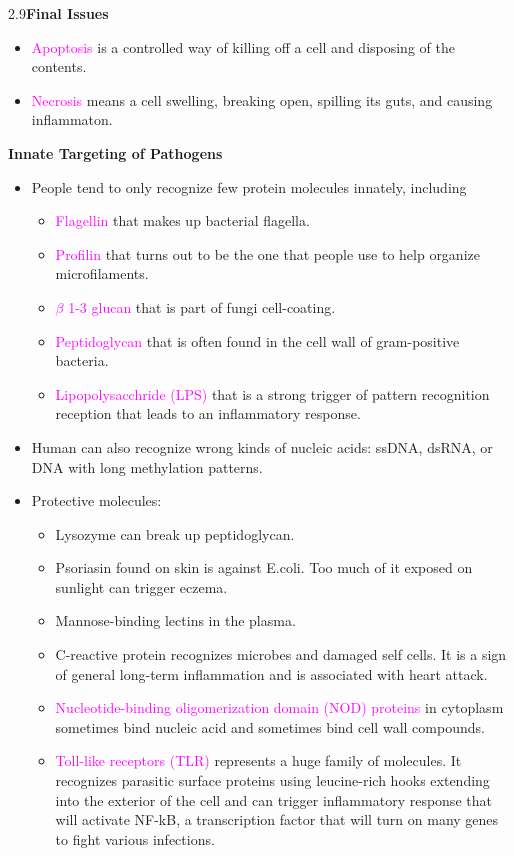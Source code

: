 \documentclass[UTF8]{book}
\newcommand{\concept}[1]{\textcolor{magenta}{#1}}
\begin{document}
2.9\quad \textbf{Final Issues}
\begin{itemize}
\item \concept{Apoptosis} is a controlled way of killing off a cell and disposing of the contents.
\item \concept{Necrosis} means a cell swelling, breaking open, spilling its guts, and causing inflammaton.
\end{itemize}
\newpage
{}\quad \textbf{Innate Targeting of Pathogens}
\begin{itemize}
\item People tend to only recognize few protein molecules innately, including 
\begin{itemize}
	\item \concept{Flagellin} that makes up bacterial flagella.
	\item \concept{Profilin} that turns out to be the one that people use to help organize microfilaments.
	\item \concept{$\beta$ 1-3 glucan} that is part of fungi cell-coating.
	\item \concept{Peptidoglycan} that is often found in the cell wall of gram-positive bacteria.
	\item \concept{Lipopolysacchride (LPS)} that is a strong trigger of pattern recognition reception that leads to an inflammatory response.
\end{itemize}
\item Human can also recognize wrong kinds of nucleic acids: ssDNA, dsRNA, or DNA with long methylation patterns.
\item Protective molecules:
\begin{itemize}
	\item Lysozyme can break up peptidoglycan.
	\item Psoriasin found on skin is against E.coli. Too much of it exposed on sunlight can trigger eczema.
	\item Mannose-binding lectins in the plasma.
	\item C-reactive protein recognizes microbes and damaged self cells. It is a sign of general long-term inflammation and is associated with heart attack.
	\item \concept{Nucleotide-binding oligomerization domain (NOD) proteins} in cytoplasm sometimes bind nucleic acid and sometimes bind cell wall compounds.
	\item \concept{Toll-like receptors (TLR)} represents a huge family of molecules. It recognizes parasitic surface proteins using leucine-rich hooks extending into the exterior of the cell and can trigger inflammatory response that will activate NF-kB, a transcription factor that will turn on many genes to fight various infections.

\end{itemize}
\end{itemize}
\end{document}
